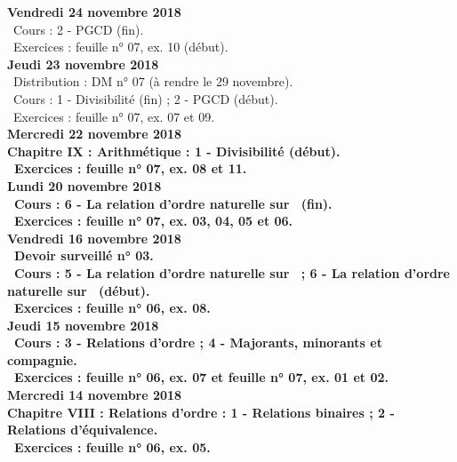 \documentclass[12pt,a4paper]{article}
\begin{document}
\noindent\textbf{Vendredi 24 novembre 2018}\\
\bu\ Cours : 2 - PGCD (fin).\\
\bu\ Exercices : feuille n° 07, ex. 10 (début).\vspace{.4cm}\\
 
\noindent\textbf{Jeudi 23 novembre 2018}\\
\bu\ Distribution : DM n° 07 (à rendre le 29 novembre).\\
\bu\ Cours : 1 - Divisibilité (fin) ; 2 - PGCD (début).\\
\bu\ Exercices : feuille n° 07, ex. 07 et 09.\vspace{.4cm}\\
 
\noindent\textbf{\bf Mercredi 22 novembre 2018}\\
\bf Chapitre IX \rm : Arithmétique : 1 - Divisibilité (début).\\
\bu\ Exercices : feuille n° 07, ex. 08 et 11.\vspace{.4cm}\\
 
\noindent\textbf{Lundi 20 novembre 2018}\\
\bu\ Cours : 6 - La relation d'ordre naturelle sur \R\ (fin).\\
\bu\ Exercices : feuille n° 07, ex. 03, 04, 05 et 06.\vspace{.4cm}\\

\noindent\textbf{Vendredi 16 novembre 2018}\\
\bu\ Devoir surveillé n° 03.\\
\bu\ Cours : 5 - La relation d'ordre naturelle sur \N\ ; 6 - La relation d'ordre naturelle sur \R\ (début).\\
\bu\ Exercices : feuille n° 06, ex. 08.\vspace{.4cm}\\
 
\noindent\textbf{Jeudi 15 novembre 2018}\\
\bu\ Cours : 3 - Relations d'ordre ;  4 - Majorants, minorants et compagnie.\\
\bu\ Exercices : feuille n° 06, ex. 07 et feuille n° 07, ex. 01 et 02.\vspace{.4cm}\\

\noindent\textbf{\bf Mercredi 14 novembre 2018}\\
\bf Chapitre VIII \rm : Relations d'ordre : 1 - Relations binaires ; 2 - Relations d'équivalence.\\
\bu\ Exercices : feuille n° 06, ex. 05.\vspace{.4cm}\\
 
\end{document}
